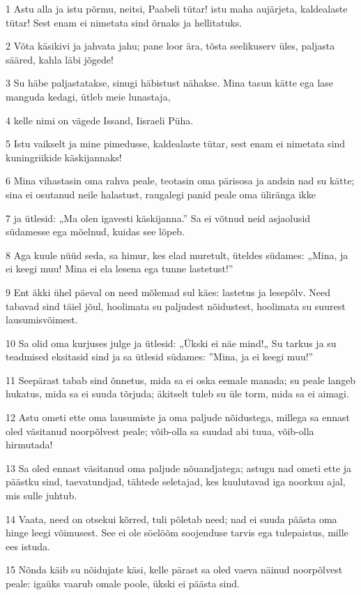 \par 1 Astu alla ja istu põrmu, neitsi, Paabeli tütar! istu maha aujärjeta, kaldealaste tütar! Sest enam ei nimetata sind õrnaks ja hellitatuks.
\par 2 Võta käsikivi ja jahvata jahu; pane loor ära, tõsta seelikuserv üles, paljasta sääred, kahla läbi jõgede!
\par 3 Su häbe paljastatakse, sinugi häbistust nähakse. Mina tasun kätte ega lase manguda kedagi, ütleb meie lunastaja,
\par 4 kelle nimi on vägede Issand, Iisraeli Püha.
\par 5 Istu vaikselt ja mine pimedusse, kaldealaste tütar, sest enam ei nimetata sind kuningriikide käskijannaks!
\par 6 Mina vihastasin oma rahva peale, teotasin oma pärisosa ja andsin nad su kätte; sina ei osutanud neile halastust, raugalegi panid peale oma üliränga ikke
\par 7 ja ütlesid: „Ma olen igavesti käskijanna.” Sa ei võtnud neid asjaolusid südamesse ega mõelnud, kuidas see lõpeb.
\par 8 Aga kuule nüüd seda, sa himur, kes elad muretult, üteldes südames: „Mina, ja ei keegi muu! Mina ei ela lesena ega tunne lastetust!”
\par 9 Ent äkki ühel päeval on need mõlemad sul käes: lastetus ja lesepõlv. Need tabavad sind täiel jõul, hoolimata su paljudest nõidustest, hoolimata su suurest lausumisvõimest.
\par 10 Sa olid oma kurjuses julge ja ütlesid: „Ükski ei näe mind!„ Su tarkus ja su teadmised eksitasid sind ja sa ütlesid südames: ”Mina, ja ei keegi muu!”
\par 11 Seepärast tabab sind õnnetus, mida sa ei oska eemale manada; su peale langeb hukatus, mida sa ei suuda tõrjuda; äkitselt tuleb su üle torm, mida sa ei aimagi.
\par 12 Astu ometi ette oma lausumiste ja oma paljude nõidustega, millega sa ennast oled väsitanud noorpõlvest peale; võib-olla sa suudad abi tuua, võib-olla hirmutada!
\par 13 Sa oled ennast väsitanud oma paljude nõuandjatega; astugu nad ometi ette ja päästku sind, taevatundjad, tähtede seletajad, kes kuulutavad iga noorkuu ajal, mis sulle juhtub.
\par 14 Vaata, need on otsekui kõrred, tuli põletab need; nad ei suuda päästa oma hinge leegi võimusest. See ei ole söelõõm soojenduse tarvis ega tulepaistus, mille ees istuda.
\par 15 Nõnda käib su nõidujate käsi, kelle pärast sa oled vaeva näinud noorpõlvest peale: igaüks vaarub omale poole, ükski ei päästa sind.

